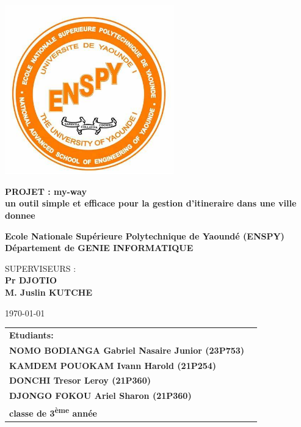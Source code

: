 \begin{titlepage}
  \centering
  \includegraphics[width=0.55\textwidth]{Images/logo.jpg}\par
  \vspace{0.1cm}

  {\LARGE \textbf{ PROJET : my-way\\un outil simple et efficace pour la gestion d'itineraire dans une ville donnee}\par}
  \vspace{0.2cm}
  {\Large \textbf{Ecole Nationale Supérieure Polytechnique de Yaoundé (ENSPY) \\
  Département de GENIE INFORMATIQUE}\par}
  \vspace{0.2cm}
  {\large SUPERVISEURS :\\
  \textbf{Pr DJOTIO \\ M. Juslin KUTCHE}\par}
  \vspace{0.2cm}
  \today\par
  \vspace{0.10cm}
  \hrulefill\par
  \vspace{0.2cm}
  \begin{table}[!htbp]
    \centering
    \large
    \begin{tabular}{l c}
      \textbf{Etudiants:} & \\
      \textbf{NOMO BODIANGA Gabriel Nasaire Junior (23P753) }& \\
       \textbf{KAMDEM POUOKAM Ivann Harold (21P254)}& \\
        \textbf{DONCHI Tresor Leroy (21P360)}& \\
         \textbf{DJONGO FOKOU Ariel Sharon (21P360) }& \\
    
      \textbf{classe de 3\textsuperscript{ème} année} 
    \end{tabular}
  \end{table}
  \noindent \hrulefill
\end{titlepage}
